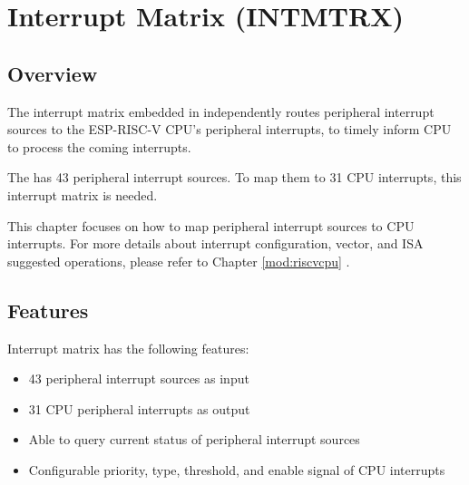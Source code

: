 \documentclass[main\_\_EN.tex]{subfiles}
\begin{document}

\ifglobal
\else
    {\let\clearpage\relax \listoftodos}
    \tableofcontents
\fi



\hypertarget{intmtrx}{}
\chapter{Interrupt Matrix (INTMTRX)}
\label{mod:intmtrx}


\section{Overview}

The interrupt matrix embedded in \chipname{} independently routes peripheral interrupt sources to the ESP-RISC-V CPU's peripheral interrupts, to timely inform CPU to process the coming interrupts. 

The \chipname{} has 43 peripheral interrupt sources. To map them to 31 CPU interrupts, this interrupt matrix is needed.

\begin{tiplisting}
This chapter focuses on how to map peripheral interrupt sources to CPU interrupts. For more details about interrupt configuration, vector, and ISA suggested operations, please refer to Chapter \ref{mod:riscvcpu} \textit{}.
\end{tiplisting}


\section{Features}
Interrupt matrix has the following features:

\begin{itemize}
    \item 43 peripheral interrupt sources as input
    \item 31 CPU peripheral interrupts as output
    \item Able to query current status of peripheral interrupt sources
    \item Configurable priority, type, threshold, and enable signal of CPU interrupts
\end{itemize}
\end{document}
